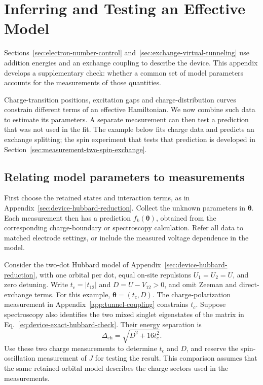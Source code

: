 \FloatBarrier
\section{Inferring and Testing an Effective Model}
\label{app:model-inference}
\label{sec:combining-measurements}

Sections~\ref{sec:electron-number-control} and~\ref{sec:exchange-virtual-tunneling}
use addition energies and an exchange coupling to describe the device.
This appendix develops a supplementary check: whether a common set of
model parameters accounts for the measurements of those quantities.

Charge-transition positions, excitation gaps and charge-distribution
curves constrain different terms of an effective Hamiltonian.
We now combine such data to estimate its parameters. A separate
measurement can then test a prediction that was not used in the fit.
The example below fits charge data and predicts an exchange splitting;
the spin experiment that tests that prediction is developed in
Section~\ref{sec:measurement-two-spin-exchange}.

\subsection{Relating model parameters to measurements}
\label{sec:measurement-model-predictions}

First choose the retained states and interaction terms, as in
Appendix~\ref{sec:device-hubbard-reduction}. Collect the unknown parameters in
$\boldsymbol\theta$. Each measurement then has a prediction
$f_k(\boldsymbol\theta)$, obtained from the corresponding
charge-boundary or spectroscopy calculation.
Refer all data to matched electrode settings, or include the
measured voltage dependence in the model.

Consider the two-dot Hubbard model of
Appendix~\ref{sec:device-hubbard-reduction}, with one orbital per dot,
equal on-site repulsions $U_1=U_2=U$, and zero detuning. Write
$t_c=|t_{12}|$ and $D=U-V_{12}>0$, and omit Zeeman and direct-exchange
terms. For this example, $\boldsymbol\theta=(t_c,D)$.
The charge-polarization measurement in
Appendix~\ref{app:tunnel-coupling} constrains $t_c$.
Suppose spectroscopy also identifies the two mixed singlet
eigenstates of the matrix in Eq.~\eqref{eq:device-exact-hubbard-check}.
Their energy separation is
\begin{equation}
 \Delta_{\mathrm{ch}}=\sqrt{D^2+16t_c^2}.
 \label{eq:measurement-charge-model-prediction}
\end{equation}
Use these two charge measurements to determine $t_c$ and $D$,
and reserve the spin-oscillation measurement of $J$ for testing
the result. This comparison assumes that the same retained-orbital
model describes the charge sectors used in the measurements.

